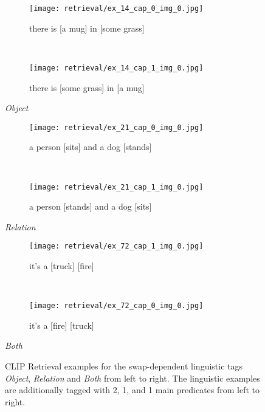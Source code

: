\begin{figure}[ht]
\centering
    \begin{minipage}[t]{.30\textwidth}
        \begin{subfigure}[t]{\textwidth}
        \centering
        \texttt{[image: retrieval/ex\_14\_cap\_0\_img\_0.jpg]}
        \caption{there is [a mug] in [some grass]}
        \end{subfigure}\\
        \begin{subfigure}[t]{\textwidth}
        \centering
        \texttt{[image: retrieval/ex\_14\_cap\_1\_img\_0.jpg]}
        \caption{there is [some grass] in [a mug]}
        \end{subfigure}%
        \caption*{\textit{Object}}
    \end{minipage}
    \hfill
    \begin{minipage}[t]{.30\textwidth}
        \begin{subfigure}[t]{\textwidth}
        \centering
        \texttt{[image: retrieval/ex\_21\_cap\_0\_img\_0.jpg]}
        \caption{a person [sits] and a dog [stands]}
        \end{subfigure}\\
        \begin{subfigure}[t]{\textwidth}
        \centering
        \texttt{[image: retrieval/ex\_21\_cap\_1\_img\_0.jpg]}
        \caption{a person [stands] and a dog [sits]}
        \end{subfigure}%
        \caption*{\textit{Relation}}
    \end{minipage}
    \hfill
    \begin{minipage}[t]{.30\textwidth}
        \begin{subfigure}[t]{\textwidth}
        \centering
        \texttt{[image: retrieval/ex\_72\_cap\_1\_img\_0.jpg]}
        \caption{it's a [truck] [fire]}
        \end{subfigure}\\
        \begin{subfigure}[t]{\textwidth}
        \centering
        \texttt{[image: retrieval/ex\_72\_cap\_0\_img\_0.jpg]}
        \caption{it's a [fire] [truck]}
        \end{subfigure}%
        \caption*{\textit{Both}}
    \end{minipage}%
    \caption{CLIP Retrieval examples for the swap-dependent linguistic tags \textit{Object}, \textit{Relation} and \textit{Both} from left to right. The linguistic examples are additionally tagged with 2, 1, and 1 main predicates from left to right.}
    \label{fig:retrieval-examples-linguistic}
\end{figure}

